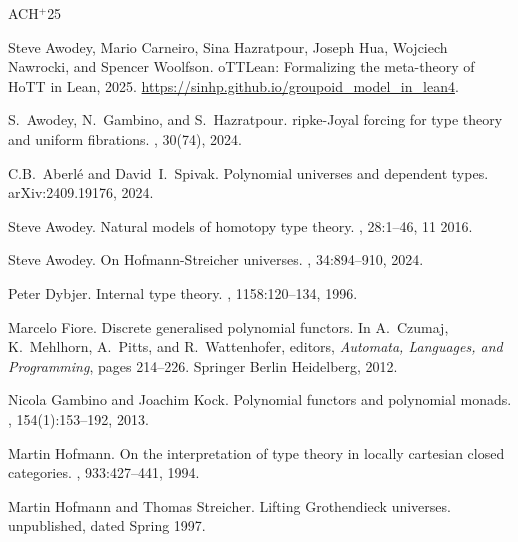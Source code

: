 \documentclass[12pt,reqno]{amsart}
\theoremstyle{remark}
\theoremstyle{definition}
\begin{document}

%
\newcommand{\etalchar}[1]{$^{#1}$}
\begin{thebibliography}{ACH{\etalchar{+}}25}

\bibitem[ACH{\etalchar{+}}25]{HoTTLean}
Steve Awodey, Mario Carneiro, Sina Hazratpour, Joseph Hua, Wojciech Nawrocki,
  and Spencer Woolfson.
o{TTL}ean: Formalizing the meta-theory of {H}o{TT} in {L}ean,
  2025.
\newblock \url{https://sinhp.github.io/groupoid_model_in_lean4}.

S.~Awodey, N.~Gambino, and S.~Hazratpour.
ripke-{J}oyal forcing for type theory and uniform fibrations.
, 30(74), 2024.

C.B.\ Aberl\'e and David~I.\ Spivak.
\newblock Polynomial universes and dependent types.
\newblock arXiv:2409.19176, 2024.

Steve Awodey.
\newblock Natural models of homotopy type theory.
, 28:1--46, 11 2016.

Steve Awodey.
\newblock On {H}ofmann-{S}treicher universes.
, 34:894--910, 2024.

Peter Dybjer.
\newblock Internal type theory.
, 1158:120--134, 1996.

Marcelo Fiore.
\newblock Discrete generalised polynomial functors.
\newblock In A.\ Czumaj, K.\ Mehlhorn, A.\ Pitts, and R.\ Wattenhofer, editors,
  {\em Automata, Languages, and Programming}, pages 214--226. Springer Berlin
  Heidelberg, 2012.

Nicola Gambino and Joachim Kock.
\newblock Polynomial functors and polynomial monads.
, 154(1):153--192, 2013.

Martin Hofmann.
\newblock On the interpretation of type theory in locally cartesian closed
  categories.
, 933:427--441, 1994.

Martin Hofmann and Thomas Streicher.
\newblock Lifting {G}rothendieck universes.
\newblock unpublished, dated Spring 1997.


\end{thebibliography}
\end{document}
